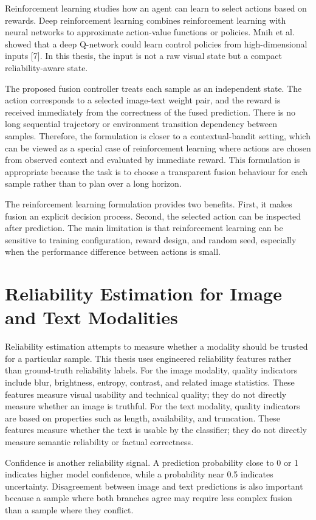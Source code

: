 Reinforcement learning studies how an agent can learn to select actions based on rewards. Deep reinforcement learning combines reinforcement learning with neural networks to approximate action-value functions or policies. Mnih et al. showed that a deep Q-network could learn control policies from high-dimensional inputs [7]. In this thesis, the input is not a raw visual state but a compact reliability-aware state.


The proposed fusion controller treats each sample as an independent state. The action corresponds to a selected image-text weight pair, and the reward is received immediately from the correctness of the fused prediction. There is no long sequential trajectory or environment transition dependency between samples. Therefore, the formulation is closer to a contextual-bandit setting, which can be viewed as a special case of reinforcement learning where actions are chosen from observed context and evaluated by immediate reward. This formulation is appropriate because the task is to choose a transparent fusion behaviour for each sample rather than to plan over a long horizon.


The reinforcement learning formulation provides two benefits. First, it makes fusion an explicit decision process. Second, the selected action can be inspected after prediction. The main limitation is that reinforcement learning can be sensitive to training configuration, reward design, and random seed, especially when the performance difference between actions is small.


\section{Reliability Estimation for Image and Text Modalities}


Reliability estimation attempts to measure whether a modality should be trusted for a particular sample. This thesis uses engineered reliability features rather than ground-truth reliability labels. For the image modality, quality indicators include blur, brightness, entropy, contrast, and related image statistics. These features measure visual usability and technical quality; they do not directly measure whether an image is truthful. For the text modality, quality indicators are based on properties such as length, availability, and truncation. These features measure whether the text is usable by the classifier; they do not directly measure semantic reliability or factual correctness.


Confidence is another reliability signal. A prediction probability close to 0 or 1 indicates higher model confidence, while a probability near 0.5 indicates uncertainty. Disagreement between image and text predictions is also important because a sample where both branches agree may require less complex fusion than a sample where they conflict.


